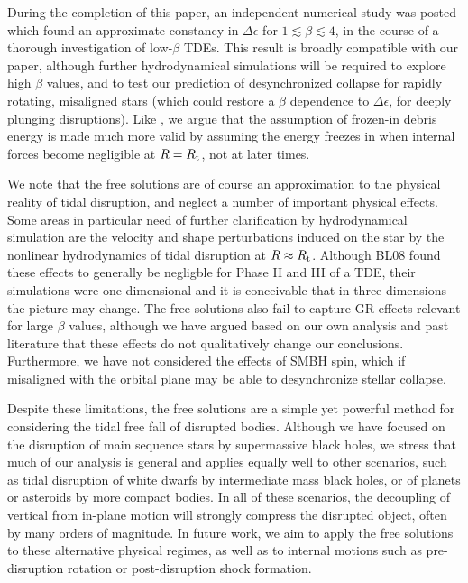 \documentclass[useAMS, twocolumn, usenatbib]{mn2e}
\begin{document}
During the completion of this paper, an independent numerical study \citep{GuillochonRamirez12} was posted which found an approximate constancy in $\Delta\epsilon$ for $1\lesssim \beta \lesssim 4$, in the course of a thorough investigation of low-$\beta$ TDEs.  This result is broadly compatible with our paper, although further hydrodynamical simulations will be required to explore high $\beta$ values, and to test our prediction of desynchronized collapse for rapidly rotating, misaligned stars (which could restore a $\beta$ dependence to $\Delta \epsilon$, for deeply plunging disruptions).  Like \citet{GuillochonRamirez12}, we argue that the assumption of frozen-in debris energy is made much more valid by assuming the energy freezes in when internal forces become negligible at $R=R_{\rm t}$, not at later times.

We note that the free solutions are of course an approximation to the physical reality of tidal disruption, and neglect a number of important physical effects.  Some areas in particular need of further clarification by hydrodynamical simulation are the velocity and shape perturbations induced on the star by the nonlinear hydrodynamics of tidal disruption at $R\approx R_{\rm t}$.  Although BL08 found these effects to generally be negligble for Phase II and III of a TDE, their simulations were one-dimensional and it is conceivable that in three dimensions the picture may change.  The free solutions also fail to capture GR effects relevant for large $\beta$ values, although we have argued based on our own analysis and past literature that these effects do not qualitatively change our conclusions.  Furthermore, we have not considered the effects of SMBH spin, which if misaligned with the orbital plane may be able to desynchronize stellar collapse.

Despite these limitations, the free solutions are a simple yet powerful method for considering the tidal free fall of disrupted bodies.  Although we have focused on the disruption of main sequence stars by supermassive black holes, we stress that much of our analysis is general and applies equally well to other scenarios, such as tidal disruption of white dwarfs by intermediate mass black holes, or of planets or asteroids by more compact bodies.  In all of these scenarios, the decoupling of vertical from in-plane motion will strongly compress the disrupted object, often by many orders of magnitude.  In future work, we aim to apply the free solutions to these alternative physical regimes, as well as to internal motions such as pre-disruption rotation or post-disruption shock formation.
\end{document}
